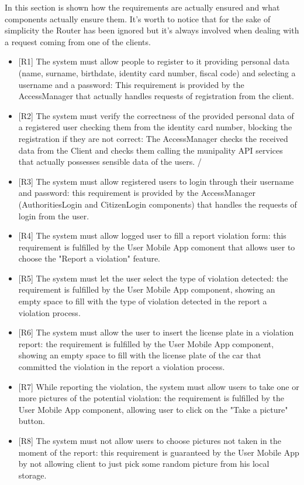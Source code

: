 \documentclass[a4paper]{report}
\begin{document}
In this section is shown how the requirements are actually ensured and what components actually ensure them. It's worth to notice that for the sake of simplicity the Router has been ignored but it's always involved when dealing with a request coming from one of the clients. 
\begin{itemize}
\item {[R1]}	\label{R1}The system must allow people to register to it providing personal data (name, surname, birthdate, identity card number, fiscal code) and selecting a username and a password: This requirement is provided by the AccessManager that actually handles requests of registration from the client.
\item {[R2]}	\label{R2}The system must verify the correctness of the provided personal data of a registered user checking them from the identity card number, blocking the registration if they are not correct: The AccessManager checks the received data from the Client and checks them calling the munipality API services that actually possesses sensible data of the users. /
\item {[R3]}	\label{R3}The system must allow registered users to login through their username and password: this requirement is provided by the AccessManager (AuthoritiesLogin and CitizenLogin components) that handles the requests of login from the user. 
\item {[R4]}	\label{R4}The system must allow logged user to fill a report violation form: this requirement is fulfilled by the User Mobile App comonent that allows user to choose the "Report a violation" feature.
\item {[R5]}	\label{R5}The system must let the user select the type of violation detected: the requirement is fulfilled by the User Mobile App component, showing an empty space to fill with the type of violation detected in the report a violation process.
\item {[R6]}	\label{R6}The system must allow the user to insert the license plate in a violation report:  the requirement is fulfilled by the User Mobile App component, showing an empty space to fill with the license plate of the car that committed the violation in the report a violation process.
\item {[R7]}	\label{R7}While reporting the violation, the system must allow users to take one or more pictures of the potential violation: the requirement is fulfilled by the User Mobile App component, allowing user to click on the "Take a picture" button.
\item {[R8]}	\label{R8}The system must not allow users to choose pictures not taken in the moment of the report: this requirement is guaranteed by the User Mobile App by not allowing client to just pick some random picture from his local storage.

\end{itemize}
\end{document}
